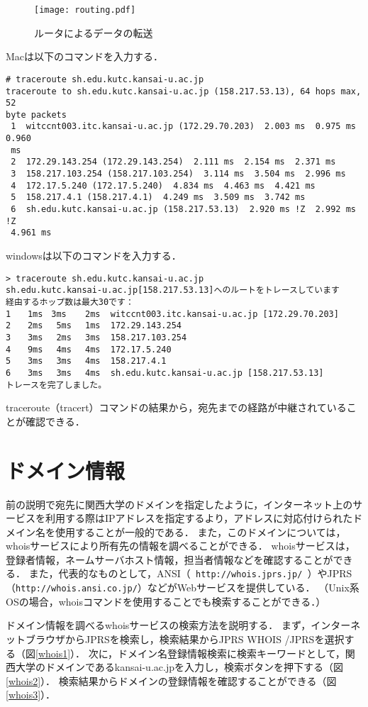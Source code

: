 \begin{figure}[tbp]
 \begin{center}
  \texttt{[image: routing.pdf]}
 \end{center}
 \caption{ルータによるデータの転送}
 \label{router}
\end{figure}
\newpage
Macは以下のコマンドを入力する．
\begin{screen}
\begin{verbatim}
# traceroute sh.edu.kutc.kansai-u.ac.jp
traceroute to sh.edu.kutc.kansai-u.ac.jp (158.217.53.13), 64 hops max, 52 
byte packets
 1  witccnt003.itc.kansai-u.ac.jp (172.29.70.203)  2.003 ms  0.975 ms  0.960 
 ms
 2  172.29.143.254 (172.29.143.254)  2.111 ms  2.154 ms  2.371 ms
 3  158.217.103.254 (158.217.103.254)  3.114 ms  3.504 ms  2.996 ms
 4  172.17.5.240 (172.17.5.240)  4.834 ms  4.463 ms  4.421 ms
 5  158.217.4.1 (158.217.4.1)  4.249 ms  3.509 ms  3.742 ms
 6  sh.edu.kutc.kansai-u.ac.jp (158.217.53.13)  2.920 ms !Z  2.992 ms !Z  
 4.961 ms
 \end{verbatim}
\end{screen}

windowsは以下のコマンドを入力する．
\begin{screen}
\begin{Verbatim}[frame=single]
> traceroute sh.edu.kutc.kansai-u.ac.jp
sh.edu.kutc.kansai-u.ac.jp[158.217.53.13]へのルートをトレースしています
経由するホップ数は最大30です：
1　　1ms　3ms　  2ms  witccnt003.itc.kansai-u.ac.jp [172.29.70.203]
2　　2ms 　5ms 　1ms  172.29.143.254
3　　3ms 　2ms 　3ms  158.217.103.254
4　　9ms 　4ms 　4ms  172.17.5.240
5　　3ms 　3ms 　4ms  158.217.4.1
6　　3ms 　3ms 　4ms  sh.edu.kutc.kansai-u.ac.jp [158.217.53.13]
トレースを完了しました。
\end{Verbatim}
\end{screen}
traceroute（tracert）コマンドの結果から，宛先までの経路が中継されていることが確認できる．

\section{ドメイン情報}
前の説明で宛先に関西大学のドメインを指定したように，インターネット上のサービスを利用する際はIPアドレスを指定するより，アドレスに対応付けられたドメイン名を使用することが一般的である．
また，このドメインについては，whoisサービスにより所有先の情報を調べることができる．
whoisサービスは，登録者情報，ネームサーバホスト情報，担当者情報などを確認することができる．
また，代表的なものとして，ANSI（\verb| http://whois.jprs.jp/ |）やJPRS（\verb|http://whois.ansi.co.jp/|）などがWebサービスを提供している．
（Unix系OSの場合，whoisコマンドを使用することでも検索することができる．）\par
ドメイン情報を調べるwhoisサービスの検索方法を説明する．
まず，インターネットブラウザからJPRSを検索し，検索結果からJPRS WHOIS /JPRSを選択する（図\ref{whois1}）．
次に，ドメイン名登録情報検索に検索キーワードとして，関西大学のドメインであるkansai-u.ac.jpを入力し，検索ボタンを押下する（図\ref{whois2}）．
検索結果からドメインの登録情報を確認することができる（図\ref{whois3}）．

